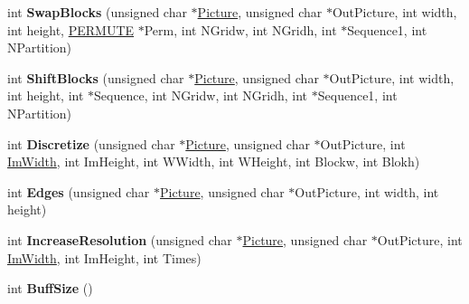 \begin{DoxyCompactItemize}
\item 
\hypertarget{classDrEffect_aa3c03c8d0fad03bed05a7b4ed578c7f8}{int {\bfseries \-Swap\-Blocks} (unsigned char $\ast$\hyperlink{classDraw_a45ed15a0527d5ba75107645dc8467078}{\-Picture}, unsigned char $\ast$\-Out\-Picture, int width, int height, \hyperlink{structPERMUTE}{\-P\-E\-R\-M\-U\-T\-E} $\ast$\-Perm, int \-N\-Gridw, int \-N\-Gridh, int $\ast$\-Sequence1, int \-N\-Partition)}\label{classDrEffect_aa3c03c8d0fad03bed05a7b4ed578c7f8}

\item 
\hypertarget{classDrEffect_a8297413646e4367507222838aee867fd}{int {\bfseries \-Shift\-Blocks} (unsigned char $\ast$\hyperlink{classDraw_a45ed15a0527d5ba75107645dc8467078}{\-Picture}, unsigned char $\ast$\-Out\-Picture, int width, int height, int $\ast$\-Sequence, int \-N\-Gridw, int \-N\-Gridh, int $\ast$\-Sequence1, int \-N\-Partition)}\label{classDrEffect_a8297413646e4367507222838aee867fd}

\item 
\hypertarget{classDrEffect_a32440e0fb7b50f5934cda4d6b8af5cf6}{int {\bfseries \-Discretize} (unsigned char $\ast$\hyperlink{classDraw_a45ed15a0527d5ba75107645dc8467078}{\-Picture}, unsigned char $\ast$\-Out\-Picture, int \hyperlink{classDraw_ab92a87c2480115eaf15a27a8fa0cd965}{\-Im\-Width}, int \-Im\-Height, int \-W\-Width, int \-W\-Height, int \-Blockw, int \-Blokh)}\label{classDrEffect_a32440e0fb7b50f5934cda4d6b8af5cf6}

\item 
\hypertarget{classDrEffect_a8dfc2959f3fc3f77fa6fcba0d5a6ba0a}{int {\bfseries \-Edges} (unsigned char $\ast$\hyperlink{classDraw_a45ed15a0527d5ba75107645dc8467078}{\-Picture}, unsigned char $\ast$\-Out\-Picture, int width, int height)}\label{classDrEffect_a8dfc2959f3fc3f77fa6fcba0d5a6ba0a}

\item 
\hypertarget{classDrEffect_a5e807a9bb2fd73525054fdc5bbe2722d}{int {\bfseries \-Increase\-Resolution} (unsigned char $\ast$\hyperlink{classDraw_a45ed15a0527d5ba75107645dc8467078}{\-Picture}, unsigned char $\ast$\-Out\-Picture, int \hyperlink{classDraw_ab92a87c2480115eaf15a27a8fa0cd965}{\-Im\-Width}, int \-Im\-Height, int \-Times)}\label{classDrEffect_a5e807a9bb2fd73525054fdc5bbe2722d}

\item 
\hypertarget{classDrEffect_aebc416ae6d83d469837a19a3080555a1}{int {\bfseries \-Buff\-Size} ()}\label{classDrEffect_aebc416ae6d83d469837a19a3080555a1}

\end{DoxyCompactItemize}
